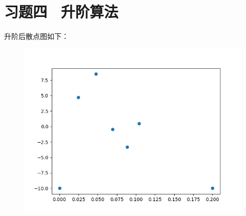 \clearpage
\section{习题四 \ 升阶算法}
升阶后散点图如下：
\begin{figure}[htbp]
    \centering
    \includegraphics[scale=0.5]{pic/4.png}
\end{figure}
